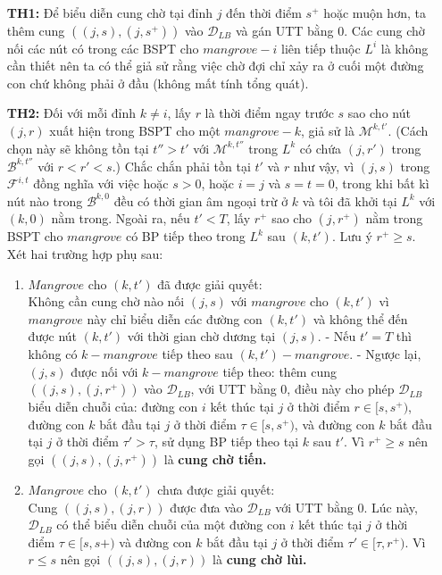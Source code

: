 \documentclass[../main.tex]{subfiles}
\begin{document}
\begin{enumerate}
\def\labelenumi{\arabic{enumi}.}
\item[\textbf{TH1:}]
Để biểu diễn cung chờ tại đỉnh \(j\) đến thời
  điểm \(s^+\) hoặc muộn hơn, ta thêm cung \(((j, s), (j, s^+))\) vào
  \(\mathcal D_{LB}\) và gán UTT bằng \(0\). Các cung chờ nối các nút có
  trong các BSPT cho \(mangrove-i\) liên tiếp thuộc \(L^i\) là không cần
  thiết nên ta có thể giả sử rằng việc chờ đợi chỉ xảy ra ở cuối một
  đường con chứ không phải ở đầu (không mất tính tổng quát).
\item[\textbf{TH2:}]
   Đối với mỗi đỉnh \(k\neq i\), lấy \(r\) là thời
  điểm ngay trước \(s\) sao cho nút \((j,r)\) xuất hiện trong BSPT cho
  một \(mangrove-k\), giả sử là \(\mathcal M^{k,t'}\). (Cách chọn này sẽ
  không tồn tại \(t'' > t'\) với \(\mathcal M^{k,t''}\) trong \(L^k\) có
  chứa \((j,r')\) trong \(\mathcal B^{k,t''}\) với \(r < r' < s\).) Chắc
  chắn phải tồn tại \(t'\) và \(r\) như vậy, vì \((j, s)\) trong
  \(\mathcal F^{i,t}\) đồng nghĩa với việc hoặc \(s>0\), hoặc \(i = j\) và
  \(s = t = 0\), trong khi bất kì nút nào trong \(\mathcal B^{k,0}\) đều có
  thời gian âm ngoại trừ ở \(k\) và tôi đã khởi tại \(L^k\) với
  \((k,0)\) nằm trong. Ngoài ra, nếu \(t'<T\), lấy \(r^+\) sao cho
  \((j,r^+)\) nằm trong BSPT cho \(mangrove\) có BP tiếp theo
  trong \(L^k\) sau \((k, t')\). Lưu ý \(r^+ \geq s\). Xét hai trường
  hợp phụ sau:

  \begin{enumerate}
  \def\labelenumii{\alph{enumii}.}
  \tightlist
  \item
    \(Mangrove\) cho \((k, t')\) đã được giải quyết: \\
    Không cần cung chờ
    nào nối \((j,s)\) với \(mangrove\) cho \((k,t')\) vì \(mangrove\)
    này chỉ biểu diễn các đường con \((k,t')\) và không thể đến được nút
    \((k, t')\) với thời gian chờ dương tại \((j, s)\). - Nếu \(t'=T\)
    thì không có \(k-mangrove\) tiếp theo sau \((k,t')-mangrove\). -
    Ngược lại, \((j,s)\) được nối với \(k-mangrove\) tiếp theo: thêm
    cung \(((j,s),(j,r^+))\) vào \(\mathcal D_{LB}\), với UTT bằng
    \(0\), điều này cho phép \(\mathcal D_{LB}\) biểu diễn chuỗi của:
    đường con \(i\) kết thúc tại \(j\) ở thời điểm \(r\in [s,s^+)\),
    đường con \(k\) bắt đầu tại \(j\) ở thời điểm \(\tau \in [s, s^+)\),
    và đường con \(k\) bắt đầu tại \(j\) ở thời điểm \(\tau' > \tau\),
    sử dụng BP tiếp theo tại \(k\) sau \(t'\). Vì \(r^+ \geq s\)
    nên gọi \(((j,s),(j,r^+))\) là \textbf{cung chờ tiến.}
  \item
    \(Mangrove\) cho \((k, t')\) chưa được giải quyết: \\
    Cung
    \(((j,s),(j,r))\) được đưa vào \(\mathcal D_{LB}\) với UTT bằng 0.
    Lúc này, \(\mathcal D_{LB}\) có thể biểu diễn chuỗi của một đường
    con \(i\) kết thúc tại \(j\) ở thời điểm \(\tau \in [s,s+)\) và
    đường con \(k\) bắt đầu tại \(j\) ở thời điểm
    \(\tau' \in [\tau,r^+)\). Vì \(r\leq s\) nên gọi \(((j,s),(j,r))\)
    là \textbf{cung chờ lùi.}
  \end{enumerate}
\end{enumerate}
\end{document}
